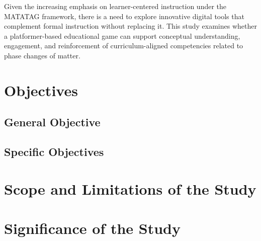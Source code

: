 Given the increasing emphasis on learner-centered instruction under the MATATAG framework, there is a need to explore innovative digital tools that complement formal instruction without replacing it. This study examines whether a platformer-based educational game can support conceptual understanding, engagement, and reinforcement of curriculum-aligned competencies related to phase changes of matter.


\section{Objectives}

\subsection{General Objective}


\subsection{Specific Objectives}



\section{Scope and Limitations of the Study}



\section{Significance of the Study}

